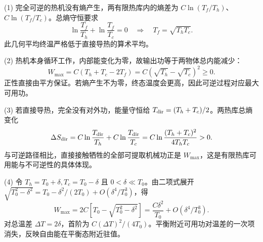 (1) 完全可逆的热机没有熵产生，两有限热库内的熵差为 \(C\ln(T_f/T_h)\)、\(C\ln(T_f/T_c)\)。总熵守恒要求
\[
\ln\frac{T_f}{T_h}+\ln\frac{T_f}{T_c}=0
\quad\Longrightarrow\quad T_f=\sqrt{T_hT_c}.
\]
此几何平均终温严格低于直接导热的算术平均。

(2) 热机本身循环工作，内部能变化为零，故输出功等于两物体总内能减少：
\[
W_{\max}=C(T_h+T_c-2T_f)
=C(\sqrt{T_h}-\sqrt{T_c})^2\ge0.
\]
正性直接由平方保证。若熵产生不为零，终态温度会更高，因此可逆过程对应最大可用功。

(3) 若直接导热，完全没有对外功，能量守恒给 \(T_{\rm dir}=(T_h+T_c)/2\)。两热库总熵变化
\[
\Delta S_{\rm dir}=C\ln\frac{T_{\rm dir}}{T_h}
+C\ln\frac{T_{\rm dir}}{T_c}
=C\ln\frac{(T_h+T_c)^2}{4T_hT_c}>0.
\]
与可逆路径相比，直接接触牺牲的全部可提取机械功正是 \(W_{\max}\)，这是有限热库可用能与不可逆性的具体体现。

(4) 令 \(T_h=T_0+\delta,T_c=T_0-\delta\) 且 \(0<\delta\ll T_0\)。由二项式展开 \(\sqrt{T_0^2-\delta^2}=T_0-\delta^2/(2T_0)+O(\delta^4/T_0^3)\)，得
\[
W_{\max}=2C[T_0-\sqrt{T_0^2-\delta^2}]
=\frac{C\delta^2}{T_0}+O(\delta^4/T_0^3).
\]
对总温差 \(\Delta T=2\delta\)，首阶为 \(C(\Delta T)^2/(4T_0)\)。平衡附近可用功对温差的一次项消失，反映自由能在平衡态附近驻值。
